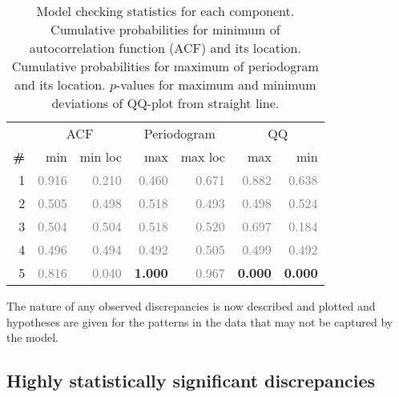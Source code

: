 \documentclass{article} %
\begin{document}
\begin{table}[htb]
\begin{center}
{\small
\begin{tabular}{|r|rr|rr|rr|}
\hline
 & \multicolumn{2}{|c|}{ACF} & \multicolumn{2}{|c|}{Periodogram} & \multicolumn{2}{|c|}{QQ} \\
\bf{\#} & {min} & {min loc} & {max} & {max loc} & {max} & {min}\\
\hline

1 & \textcolor{gray}{0.916} & \textcolor{gray}{0.210} & \textcolor{gray}{0.460} & \textcolor{gray}{0.671} & \textcolor{gray}{0.882} & \textcolor{gray}{0.638}\\

2 & \textcolor{gray}{0.505} & \textcolor{gray}{0.498} & \textcolor{gray}{0.518} & \textcolor{gray}{0.493} & \textcolor{gray}{0.498} & \textcolor{gray}{0.524}\\

3 & \textcolor{gray}{0.504} & \textcolor{gray}{0.504} & \textcolor{gray}{0.518} & \textcolor{gray}{0.520} & \textcolor{gray}{0.697} & \textcolor{gray}{0.184}\\

4 & \textcolor{gray}{0.496} & \textcolor{gray}{0.494} & \textcolor{gray}{0.492} & \textcolor{gray}{0.505} & \textcolor{gray}{0.499} & \textcolor{gray}{0.492}\\

5 & \textcolor{gray}{0.816} & \textcolor{gray}{0.040} & \textbf{1.000} & \textcolor{gray}{0.967} & \textbf{0.000} & \textbf{0.000}\\

\hline
\end{tabular}
\caption{
Model checking statistics for each component.
Cumulative probabilities for minimum of autocorrelation function (ACF) and its location.
Cumulative probabilities for maximum of periodogram and its location.
$p$-values for maximum and minimum deviations of QQ-plot from straight line.
}
\label{table:check}
}
\end{center}
\end{table}

The nature of any observed discrepancies is now described and plotted and hypotheses are given for the patterns in the data that may not be captured by the model.

\subsection{Highly statistically significant discrepancies}
\end{document}
